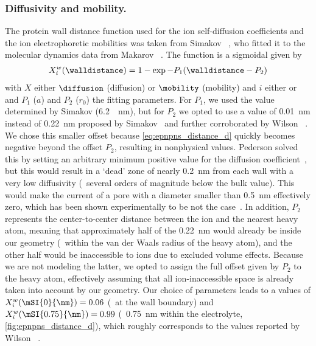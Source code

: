 \subsubsection{Diffusivity and mobility.}
%
The protein wall distance function used for the ion self-diffusion coefficients and the ion electrophoretic
mobilities was taken from Simakov \etal{}~\cite{Simakov-2010}, who fitted it to the molecular dynamics data
from Makarov \etal{}~\cite{Makarov-1998}. The function is a sigmoidal given by
%
\begin{align}\label{eq:epnpns_distance_d}
  X_{i}^w (\walldistance) = 1 - \exp{-P_1 (\walldistance - P_2)}
\end{align}
%
with $X$ either $\diffusion$ (diffusion) or $\mobility$ (mobility) and $i$ either \Na{} or \Cl{} and $P_1$
($a$) and $P_2$ ($r_0$) the fitting parameters. For $P_1$, we used the value determined by Simakov \etal{}
(\SI{6.2}{\per\nm}), but for $P_2$ we opted to use a value of \SI{0.01}{\nm} instead of \SI{0.22}{\nm}
proposed by Simakov~\cite{Simakov-2010} and further corroborated by Wilson \etal{}~\cite{Wilson-2019}. We chose
this smaller offset because \cref{eq:epnpns_distance_d} quickly becomes negative beyond the offset $P_2$,
resulting in nonphysical values. Pederson \etal{} solved this by setting an arbitrary minimum positive value
for the diffusion coefficient~\cite{Pederson-2015}, but this would result in a `dead' zone of nearly
\SI{0.2}{\nm} from each wall with a very low diffusivity (\ie~several orders of magnitude below the bulk
value). This would make the current of a pore with a diameter smaller than \SI{0.5}{\nm} effectively zero,
which has been shown experimentally to be not the case~\cite{Rigo-2019}. In addition, $P_2$ represents the
center-to-center distance between the ion and the nearest heavy atom, meaning that approximately half of the
\SI{0.22}{\nm} would already be inside our geometry (\ie~within the van der Waals radius of the heavy atom),
and the other half would be inaccessible to ions due to excluded volume effects. Because we are not modeling
the latter, we opted to assign the full offset given by $P_2$ to the heavy atom, effectively assuming that all
ion-inaccessible space is already taken into account by our geometry. Our choice of parameters leads to a
values of $X_{i}^w (\mSI{0}{\nm}) = 0.06$ (\ie~at the wall boundary) and $X_{i}^w (\mSI{0.75}{\nm}) = 0.99$
(\ie~\SI{0.75}{\nm} within the electrolyte, \cref{fig:epnpns_distance_d}), which roughly corresponds to the
values reported by Wilson \etal{}~\cite{Wilson-2019}.
%

